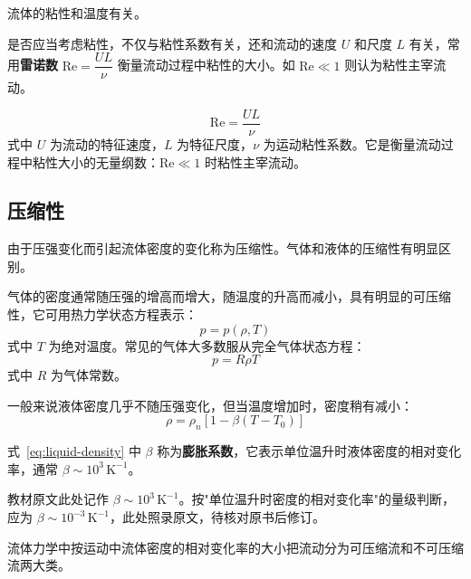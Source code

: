 \begin{note}
	流体的粘性和温度有关。
\end{note}

是否应当考虑粘性，不仅与粘性系数有关，还和流动的速度 $U$ 和尺度 $L$ 有关，常用\textbf{雷诺数} $\mathrm{Re}=\dfrac{UL}{\nu}$ 衡量流动过程中粘性的大小。如 $\mathrm{Re}\ll 1$ 则认为粘性主宰流动。

\begin{keybox}[雷诺数]
	\[
	\mathrm{Re}=\frac{UL}{\nu}
	\]
	式中 $U$ 为流动的特征速度，$L$ 为特征尺度，$\nu$ 为运动粘性系数。它是衡量流动过程中粘性大小的无量纲数：$\mathrm{Re}\ll 1$ 时粘性主宰流动。
\end{keybox}

\subsection{压缩性}

\begin{definition}[压缩性]
	由于压强变化而引起流体密度的变化称为压缩性。气体和液体的压缩性有明显区别。
\end{definition}

气体的密度通常随压强的增高而增大，随温度的升高而减小，具有明显的可压缩性，它可用热力学状态方程表示：
\begin{equation}\label{eq:thermal-state-equation}
	p=p(\rho,T)
\end{equation}
式中 $T$ 为绝对温度。常见的气体大多数服从完全气体状态方程：
\begin{equation}\label{eq:perfect-gas}
	p=R\rho T
\end{equation}
式中 $R$ 为气体常数。

一般来说液体密度几乎不随压强变化，但当温度增加时，密度稍有减小：
\begin{equation}\label{eq:liquid-density}
	\rho=\rho_n\left[1-\beta(T-T_0)\right]
\end{equation}

\begin{definition}[膨胀系数]
	式~\eqref{eq:liquid-density} 中 $\beta$ 称为\textbf{膨胀系数}，它表示单位温升时液体密度的相对变化率，通常 $\beta\sim10^{3}\,\mathrm{K^{-1}}$。
\end{definition}

\begin{warnbox}[存疑]
	教材原文此处记作 $\beta\sim10^{3}\,\mathrm{K^{-1}}$。按"单位温升时密度的相对变化率"的量级判断，应为 $\beta\sim10^{-3}\,\mathrm{K^{-1}}$，此处照录原文，待核对原书后修订。
\end{warnbox}

流体力学中按运动中流体密度的相对变化率的大小把流动分为可压缩流和不可压缩流两大类。
